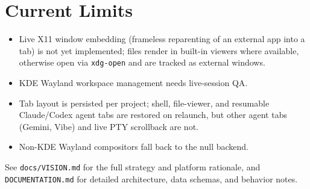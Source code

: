\documentclass[11pt,a4paper]{article}
\newcommand{\code}[1]{\texttt{#1}}
\begin{document}
\section{Current Limits}

\begin{itemize}
  \item Live X11 window embedding (frameless reparenting of an external app into
  a tab) is not yet implemented; files render in built-in viewers where
  available, otherwise open via \code{xdg-open} and are tracked as external
  windows.
  \item KDE Wayland workspace management needs live-session QA.
  \item Tab layout is persisted per project; shell, file-viewer, and resumable
  Claude/Codex agent tabs are restored on relaunch, but other agent tabs
  (Gemini, Vibe) and live PTY scrollback are not.
  \item Non-KDE Wayland compositors fall back to the null backend.
\end{itemize}

\vfill
\begin{center}
\small\color{tabtivitygray}
See \code{docs/VISION.md} for the full strategy and platform rationale, and
\code{DOCUMENTATION.md} for detailed architecture, data schemas, and behavior
notes.
\end{center}
\end{document}
